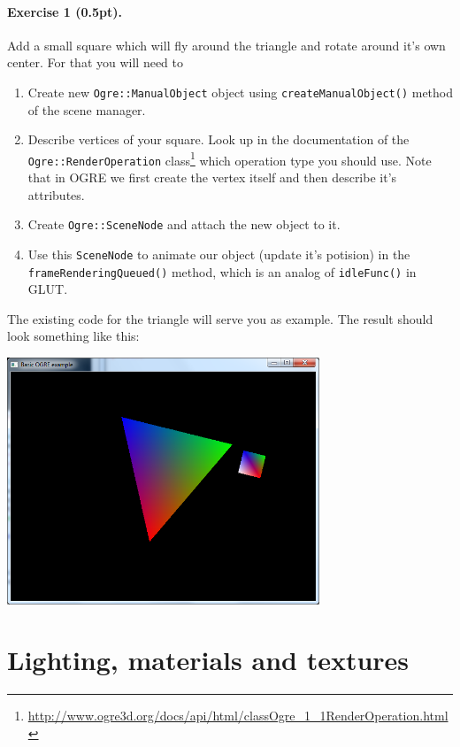 \documentclass{article}
\newenvironment{exercise}[2]{\paragraph{Exercise #1 (#2pt).} }{
\medskip}
\begin{document}
\begin{exercise}{1}{0.5}
Add a small square which will fly around the triangle and rotate around it's own center. For that you will need to
\begin{enumerate}
	\item Create new \verb#Ogre::ManualObject# object using \verb#createManualObject()# method of the scene manager.
	\item Describe vertices of your square. Look up in the documentation of the \\
\verb#Ogre::RenderOperation# class\footnote{\url{http://www.ogre3d.org/docs/api/html/classOgre_1_1RenderOperation.html}} which operation type you should use. Note that in OGRE we first create the vertex itself and then describe it's attributes.
	\item Create \verb#Ogre::SceneNode# and attach the new object to it.
	\item Use this \verb#SceneNode# to animate our object (update it's potision) in the \verb#frameRenderingQueued()# method, which is an analog of \verb#idleFunc()# in GLUT.
\end{enumerate}
The existing code for the triangle will serve you as example. The result should look something like this:
\begin{center}
\includegraphics[width=0.7\textwidth]{ex1.png}
\end{center}
\end{exercise}

\section{Lighting, materials and textures}
\end{document}
